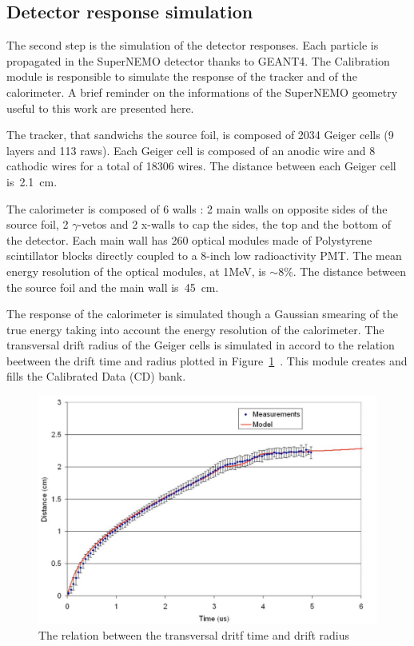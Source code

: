 \documentclass[main.tex]{subfiles}
\begin{document}
\FloatBarrier


\subsection{Detector response simulation}\label{sec:DectectorResponseBi214}


\noindent The second step is the simulation of the detector responses. Each particle is propagated in the SuperNEMO detector thanks to GEANT4. The Calibration module is responsible to simulate the response of the tracker and of the calorimeter. A brief reminder on the informations of the SuperNEMO geometry useful to this work are presented here.


\bigskip


\noindent The tracker, that sandwichs the source foil, is composed of 2034 Geiger cells (9 layers and 113 raws). Each Geiger cell is composed of an anodic wire and 8 cathodic wires for a total of 18306 wires. The distance between each Geiger cell is~2.1~cm.


\bigskip


\noindent The calorimeter is composed of 6 walls : 2 main walls on opposite sides of the source foil, 2 $\gamma$-vetos and 2 x-walls to cap the sides, the top and the bottom of the detector. Each main wall has 260 optical modules made of Polystyrene scintillator blocks directly coupled to a 8-inch low radioactivity PMT. The mean energy resolution of the optical modules, at 1MeV, is $\sim$8$\%$. The distance between the source foil and the main wall is~45~cm.   


\bigskip


\noindent The response of the calorimeter is simulated though a Gaussian smearing of the true energy taking into account the energy resolution of the calorimeter.  The transversal drift radius of the Geiger cells is simulated in accord to the relation beetween the drift time and radius plotted in Figure~\ref{drift_time}~\cite{DriftTimeModel}. This module creates and fills the Calibrated Data (CD) bank.


\begin{figure}[h!]
\begin{center}
\includegraphics[scale=0.25]{pictures/Chap5/drift_time.png}
\caption{The relation between the transversal dritf time and drift radius}
\label{drift_time}
\end{center}
\end{figure}
\end{document}
